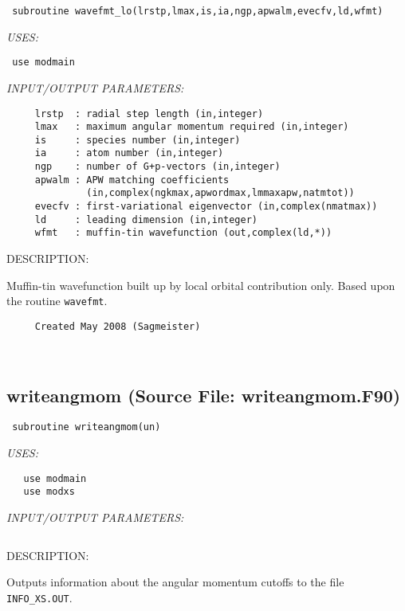 \documentclass[11pt]{article}
\begin{document}
\begin{verbatim} subroutine wavefmt_lo(lrstp,lmax,is,ia,ngp,apwalm,evecfv,ld,wfmt)\end{verbatim}{\em USES:}
\begin{verbatim} use modmain\end{verbatim}{\em INPUT/OUTPUT PARAMETERS:}
\begin{verbatim}     lrstp  : radial step length (in,integer)
     lmax   : maximum angular momentum required (in,integer)
     is     : species number (in,integer)
     ia     : atom number (in,integer)
     ngp    : number of G+p-vectors (in,integer)
     apwalm : APW matching coefficients
              (in,complex(ngkmax,apwordmax,lmmaxapw,natmtot))
     evecfv : first-variational eigenvector (in,complex(nmatmax))
     ld     : leading dimension (in,integer)
     wfmt   : muffin-tin wavefunction (out,complex(ld,*))\end{verbatim}
{\sf DESCRIPTION:\\ }


     Muffin-tin wavefunction built up by local orbital contribution only.
     Based upon the routine {\tt wavefmt}.
  
\begin{verbatim}     Created May 2008 (Sagmeister)\end{verbatim}


 
 
\mbox{}\hrulefill\ 
 
\subsection{writeangmom (Source File: writeangmom.F90)}


\begin{verbatim} subroutine writeangmom(un)\end{verbatim}{\em USES:}
\begin{verbatim}   use modmain
   use modxs\end{verbatim}{\em INPUT/OUTPUT PARAMETERS:}
\begin{verbatim} \end{verbatim}
{\sf DESCRIPTION:\\ }

    Outputs information about the angular momentum cutoffs to the file
     {\tt INFO\_XS.OUT}.
  
\end{document}
